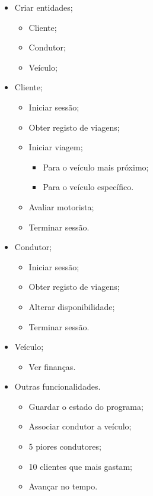\documentclass[a4paper]{article}
\begin{document}
\begin{itemize}
    \item Criar entidades;
        \begin{itemize}
        \item{Cliente;}
        \item{Condutor;}
        \item{Veículo;}
        \end{itemize}
    \item Cliente;
        \begin{itemize}
        \item{Iniciar sessão;}
        \item{Obter registo de viagens;}
        \item{Iniciar viagem;}
            \begin{itemize}
            \item{Para o veículo mais próximo;}
            \item{Para o veículo específico.}
            \end{itemize}
        \item{Avaliar motorista;}
        \item{Terminar sessão.}
        \end{itemize}
    \item Condutor;
        \begin{itemize}
        \item{Iniciar sessão;}
        \item{Obter registo de viagens;}
        \item{Alterar disponibilidade;}
        \item{Terminar sessão.}
        \end{itemize}
    \item Veículo;
        \begin{itemize}
        \item{Ver finanças.}
        \end{itemize}
    \item Outras funcionalidades.
        \begin{itemize}
        \item{Guardar o estado do programa;}
        \item{Associar condutor a veículo;}
        \item{5 piores condutores;}
        \item{10 clientes que mais gastam;}
        \item{Avançar no tempo.}
        \end{itemize}
\end{itemize}
\end{document}
